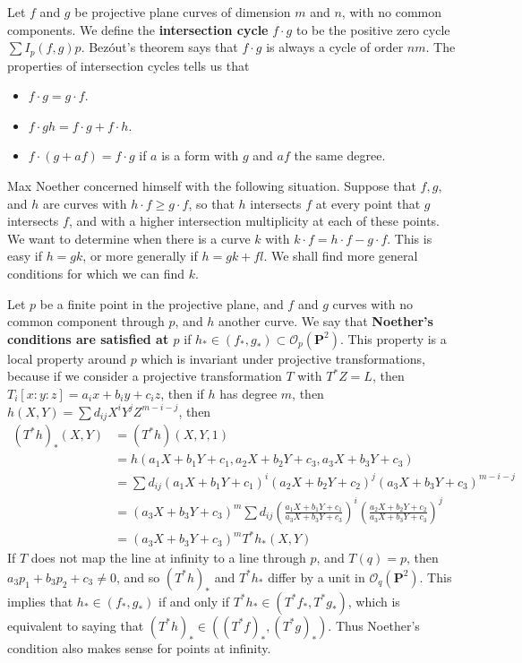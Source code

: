 Let $f$ and $g$ be projective plane curves of dimension $m$ and $n$, with no common components. We define the {\bf intersection cycle} $f \cdot g$ to be the positive zero cycle $\sum I_p(f,g) p$. Bez\'{o}ut's theorem says that $f \cdot g$ is always a cycle of order $nm$. The properties of intersection cycles tells us that
%
\begin{itemize}
    \item $f \cdot g = g \cdot f$.
    \item $f \cdot gh = f \cdot g + f \cdot h$.
    \item $f \cdot (g + af) = f \cdot g$ if $a$ is a form with $g$ and $af$ the same degree.
\end{itemize}
%
Max Noether concerned himself with the following situation. Suppose that $f,g$, and $h$ are curves with $h \cdot f \geq g \cdot f$, so that $h$ intersects $f$ at every point that $g$ intersects $f$, and with a higher intersection multiplicity at each of these points. We want to determine when there is a curve $k$ with $k \cdot f = h \cdot f - g \cdot f$. This is easy if $h = gk$, or more generally if $h = gk + fl$. We shall find more general conditions for which we can find $k$.

Let $p$ be a finite point in the projective plane, and $f$ and $g$ curves with no common component through $p$, and $h$ another curve. We say that {\bf Noether's conditions are satisfied at $p$} if $h_* \in (f_*, g_*) \subset \mathcal{O}_p(\mathbf{P}^2)$. This property is a local property around $p$ which is invariant under projective transformations, because if we consider a projective transformation $T$ with $T^*Z = L$, then
%
$T_i[x:y:z] = a_ix + b_iy + c_iz$, then if $h$ has degree $m$, then $h(X,Y) = \sum d_{ij}X^iY^jZ^{m-i-j}$, then
%
\begin{align*}
    (T^*h)_*(X,Y) &= (T^*h)(X,Y,1)\\
    &= h(a_1X + b_1Y + c_1, a_2X + b_2Y + c_3, a_3X + b_3Y + c_3)\\
    &= \sum d_{ij} (a_1X + b_1Y + c_1)^i(a_2X + b_2Y + c_2)^j(a_3X + b_3Y + c_3)^{m-i-j}\\
    &= (a_3X + b_3Y + c_3)^m \sum d_{ij} \left( \frac{a_1X + b_1Y + c_1}{a_3X + b_3Y + c_3} \right)^i \left( \frac{a_2X + b_2Y + c_2}{a_3X + b_3Y + c_3} \right)^j\\
    &= (a_3X + b_3Y + c_3)^m T^*h_*(X,Y)
\end{align*}
%
If $T$ does not map the line at infinity to a line through $p$, and $T(q) = p$, then $a_3p_1 + b_3p_2 + c_3 \neq 0$, and so $(T^*h)_*$ and $T^*h_*$ differ by a unit in $\mathcal{O}_q(\mathbf{P}^2)$. This implies that $h_* \in (f_*, g_*)$ if and only if $T^*h_* \in (T^*f_*, T^*g_*)$, which is equivalent to saying that $(T^*h)_* \in ((T^*f)_*, (T^*g)_*)$. Thus Noether's condition also makes sense for points at infinity.

